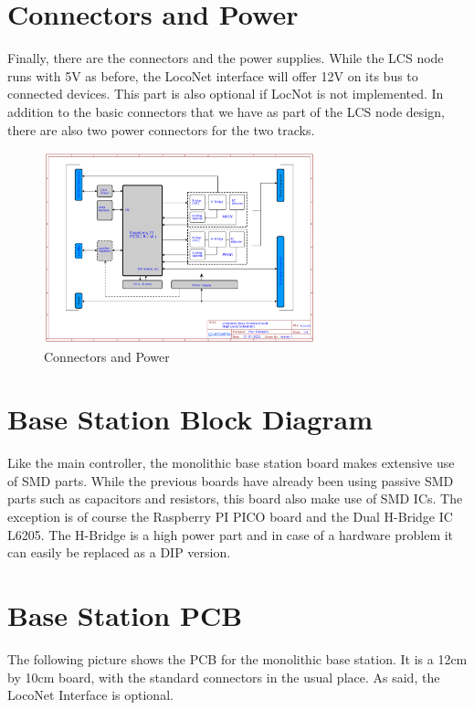 \section{ Connectors and Power}

Finally, there are the connectors and the power supplies. While the LCS node runs with 5V as before, the LocoNet interface will offer 12V on its bus to connected devices. This part is also optional if LocNot is not implemented. In addition to the basic connectors that we have as part of the LCS node design, there are also two power connectors for the two tracks.

\begin{figure}[htbp]
    \centering
    \includegraphics[page=6, width=0.7\textwidth]{./Schematics/Schematic_LcsNodes-Base-Station-Board.pdf}
    \caption{Connectors and Power}
\end{figure}
\FloatBarrier

\section{Base Station Block Diagram}
Like the main controller, the monolithic base station board makes extensive use of SMD parts. While the previous boards have already been using passive SMD parts such as capacitors and resistors, this board also make use of SMD ICs. The exception is of course the Raspberry PI PICO board and the Dual H-Bridge IC L6205. The H-Bridge is a high power part and in case of a hardware problem it can easily be replaced as a DIP version.

\section{Base Station PCB}

The following picture shows the PCB for the monolithic base station. It is a 12cm by 10cm board, with the standard connectors in the usual place. As said, the LocoNet Interface is optional. 


